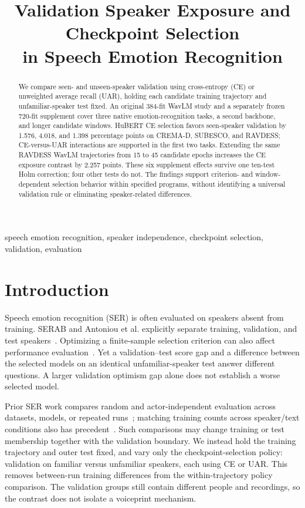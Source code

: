 \documentclass[letterpaper]{article}
\title{Validation Speaker Exposure and Checkpoint Selection\\in Speech Emotion Recognition}
\begin{document}
\maketitle
\begin{abstract}
We compare seen- and unseen-speaker validation using cross-entropy (CE) or unweighted average recall (UAR), holding each candidate training trajectory and unfamiliar-speaker test fixed. An original 384-fit WavLM study and a separately frozen 720-fit supplement cover three native emotion-recognition tasks, a second backbone, and longer candidate windows. HuBERT CE selection favors seen-speaker validation by 1.576, 4.018, and 1.398 percentage points on CREMA-D, SUBESCO, and RAVDESS; CE-versus-UAR interactions are supported in the first two tasks. Extending the same RAVDESS WavLM trajectories from 15 to 45 candidate epochs increases the CE exposure contrast by 2.257 points. These six supplement effects survive one ten-test Holm correction; four other tests do not. The findings support criterion- and window-dependent selection behavior within specified programs, without identifying a universal validation rule or eliminating speaker-related differences.
\end{abstract}
\begin{keywords}
speech emotion recognition, speaker independence, checkpoint selection, validation, evaluation
\end{keywords}

\section{Introduction}
Speech emotion recognition (SER) is often evaluated on speakers absent from training. SERAB and Antoniou et al. explicitly separate training, validation, and test speakers~\cite{serab,antoniou}. Optimizing a finite-sample selection criterion can also affect performance evaluation~\cite{cawley}. Yet a validation--test score gap and a difference between the selected models on an identical unfamiliar-speaker test answer different questions. A larger validation optimism gap alone does not establish a worse selected model.

Prior SER work compares random and actor-independent evaluation across datasets, models, or repeated runs~\cite{ibrahim,zielonka,kumari}; matching training counts across speaker/text conditions also has precedent~\cite{atmaja}. Such comparisons may change training or test membership together with the validation boundary. We instead hold the training trajectory and outer test fixed, and vary only the checkpoint-selection policy: validation on familiar versus unfamiliar speakers, each using CE or UAR. This removes between-run training differences from the within-trajectory policy comparison. The validation groups still contain different people and recordings, so the contrast does not isolate a voiceprint mechanism.
\end{document}
